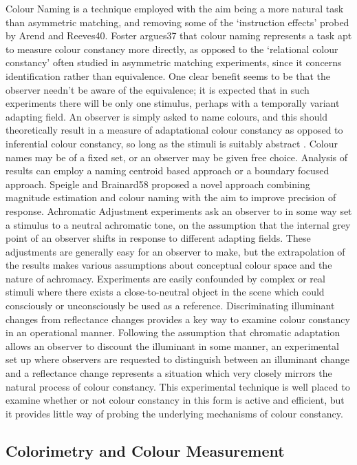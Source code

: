 Colour Naming is a technique employed with the aim being a more natural task than  asymmetric matching, and removing some of the `instruction effects' probed by Arend and Reeves40. Foster argues37 that colour naming represents a task apt to measure colour constancy more directly, as opposed to the `relational colour constancy' often studied in asymmetric matching experiments, since it concerns identification rather than equivalence. One clear benefit seems to be that the observer needn't be aware of the equivalence; it is expected that in such experiments there will be only one stimulus, perhaps with a temporally variant adapting field. An observer is simply asked to name colours, and this should theoretically result in a measure of adaptational colour constancy as opposed to inferential colour constancy, so long as the stimuli is suitably abstract . Colour names may be of a fixed set, or an observer may be given free choice. Analysis of results can employ a naming centroid based approach or a boundary focused approach. Speigle and Brainard58 proposed a novel approach combining magnitude estimation and colour naming with the aim to improve precision of response.
Achromatic Adjustment experiments ask an observer to in some way set a stimulus to a neutral achromatic tone, on the assumption that the internal grey point of an observer shifts in response to different adapting fields. These adjustments are generally easy for an observer to make, but the extrapolation of the results makes various assumptions about conceptual colour space and the nature of achromacy. Experiments are easily confounded by complex or real stimuli where there exists a close-to-neutral object in the scene which could consciously or unconsciously be used as a reference.
Discriminating illuminant changes from reflectance changes provides a key way to examine colour constancy in an operational manner. Following the assumption that chromatic adaptation allows an observer to discount the illuminant in some manner, an experimental set up where observers are requested to distinguish between an illuminant change and a reflectance change represents a situation which very closely mirrors the natural process of colour constancy. This experimental technique is well placed to examine whether or not colour constancy in this form is active and efficient, but it provides little way of probing the underlying mechanisms of colour constancy.


\subsection{Colorimetry and Colour Measurement}

